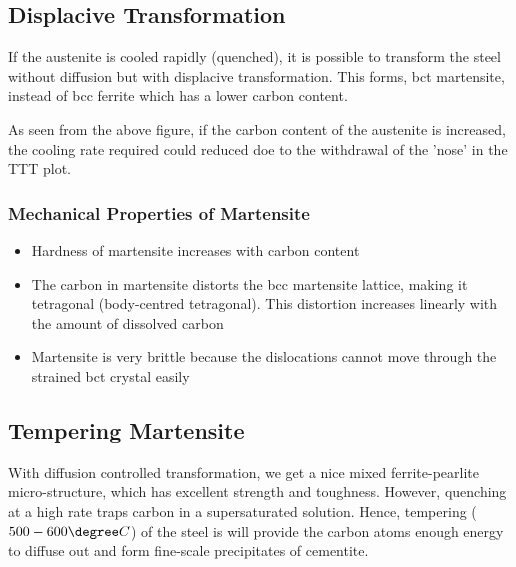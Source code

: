 

\subsection{Displacive Transformation} %
\label{sub:displacive_transformation}

If the austenite is cooled rapidly (quenched), it is possible to transform the steel without diffusion but with displacive transformation. This forms, bct martensite, instead of bcc ferrite which has a lower carbon content.


As seen from the above figure, if the carbon content of the austenite is increased, the cooling rate required could reduced doe to the withdrawal of the 'nose' in the TTT plot.

\subsubsection{Mechanical Properties of Martensite} %
\label{ssub:mechanical_properties_of_martensite}

\begin{itemize}
  \item Hardness of martensite increases with carbon content
  \item The carbon in martensite distorts the bcc martensite lattice, making it tetragonal (body-centred tetragonal). This distortion increases linearly with the amount of dissolved carbon
  \item Martensite is very brittle because the dislocations cannot move through the strained bct crystal easily
\end{itemize}



\subsection{Tempering Martensite} %
\label{sub:tempering_martensite}

With diffusion controlled transformation, we get a nice mixed ferrite-pearlite micro-structure, which has excellent strength and toughness. However, quenching at a high rate traps carbon in a supersaturated solution. Hence, tempering ($500-600\degree C$) of the steel is will provide the carbon atoms enough energy to diffuse out and form fine-scale precipitates of cementite. 

